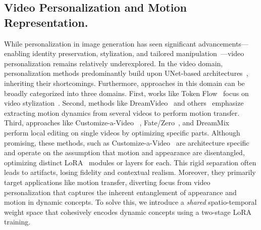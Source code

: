 \subsection{Video Personalization and Motion Representation.}
While personalization in image generation has seen significant advancements—enabling identity preservation, stylization, and tailored manipulation~\cite{ruiz2023dreambooth,ruiz2023hyperdreambooth,gal2022image, liu2024unziploraseparatingcontentstyle,jones2024customizingtexttoimagemodelssingle}---video personalization remains relatively underexplored. In the video domain, personalization methods predominantly build upon UNet-based architectures~\cite{he2024idanimatorzeroshotidentitypreservinghuman,ma2024magicmeidentityspecificvideocustomized,zhang2024moonshotcontrollablevideogeneration,zhou2024storydiffusionconsistentselfattentionlongrange,bai2024uniedit,wu2023tuneavideooneshottuningimage}, inheriting their shortcomings.
Furthermore, approaches in this domain can be broadly categorized into three domains.
First, works like Token Flow~\cite{tokenflow2023} focus on video stylization~\cite{cai2023genren,kara2024rave,liang2023flowvid,zhang2023motioncrafter}.
Second, methods like DreamVideo~\cite{wei2023dreamvideo} and others~\cite{wu2024customttt,materzynska2024newmove,zhao2023motiondirector} emphasize extracting motion dynamics from several videos to perform motion transfer.
Third, approaches like Customize-a-Video~\cite{ren2024customize} , Fate/Zero~\cite{qi2023fatezero}, and DreamMix~\cite{molad2023dreamixvideodiffusionmodels} perform local editing on single videos by optimizing specific parts.
Although promising, these methods, such as Customize-a-Video~\cite{ren2024customize} are architecture specific and operate on the assumption that motion and appearance are disentangled, optimizing distinct LoRA~\cite{hu2021loralowrankadaptationlarge} modules or layers for each.
This rigid separation often leads to artifacts, losing fidelity and contextual realism.
Moreover, they primarily target applications like motion transfer, diverting focus from video personalization that captures the inherent entanglement of appearance and motion in dynamic concepts.
To solve this, we introduce a \textit{shared} spatio-temporal weight space that cohesively encodes dynamic concepts using a two-stage LoRA~\cite{hu2021loralowrankadaptationlarge} training.


